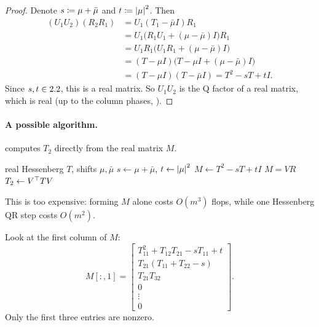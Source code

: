 \begin{proof}
  Denote $s \coloneqq \mu + \bar{\mu}$ and $t \coloneqq \left\lvert \mu \right\rvert^2$. Then
  \begin{equation}
    \begin{aligned}
      (U_1U_2)(R_2R_1) &= U_1(T_1 - \bar{\mu}I)R_1 \\
      &= U_1\bigl(R_1U_1 + (\mu - \bar{\mu})I\bigr)R_1 \\
      &= U_1R_1\bigl(U_1R_1 + (\mu - \bar{\mu})I\bigr) \\
      &= (T - \mu I)\bigl(T - \mu I + (\mu - \bar{\mu})I\bigr) \\
      &= (T - \mu I)(T - \bar{\mu}I) = T^2 - sT + tI.
    \end{aligned}
  \end{equation}
  Since $s, t \in 2.2$, this is a real matrix. So $U_1U_2$ is the Q factor of a real matrix, which is real (up to the column phases, ).
\end{proof}

\paragraph{A possible algorithm.}  computes $T_2$ directly from the real matrix $M$.

\begin{algorithm}[H]
  \caption{Explicit double-shift step.}
  \label{alg:francis-explicit}
  \begin{algorithmic}[1]
    \Require real Hessenberg $T$, shifts $\mu, \bar{\mu}$
    \State $s \gets \mu + \bar{\mu}$, $t \gets \left\lvert \mu \right\rvert^2$
    \State $M \gets T^2 - sT + tI$
    \State $M = VR$ 
    \State $T_2 \gets V^\top TV$
  \end{algorithmic}
\end{algorithm}

This is too expensive: forming $M$ alone costs $O(m^3)$ flops, while one Hessenberg QR step costs $O(m^2)$.

Look at the first column of $M$:
\begin{equation}
  M[:, 1] = \begin{bmatrix}
    T_{11}^2 + T_{12}T_{21} - sT_{11} + t \\
    T_{21}(T_{11} + T_{22} - s) \\
    T_{21}T_{32} \\
    0 \\
    \vdots \\
    0
  \end{bmatrix}.
  \label{eq:francis-first-col}
\end{equation}
Only the first three entries are nonzero.

